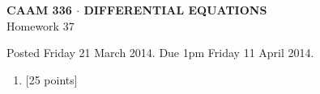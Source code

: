 \documentclass[10pt]{article}
\begin{document}
\vspace*{-5em}
\begin{center}
\large \textsf{\textbf{CAAM 336 $\cdot$ DIFFERENTIAL EQUATIONS}\\[0.5em]
Homework 37 }
\end{center}

Posted Friday 21 March 2014.  Due 1pm Friday 11 April 2014.

\begin{enumerate}\addtocounter{enumi}{36}
\item {[25 points]}  
\end{enumerate}
\end{document}
